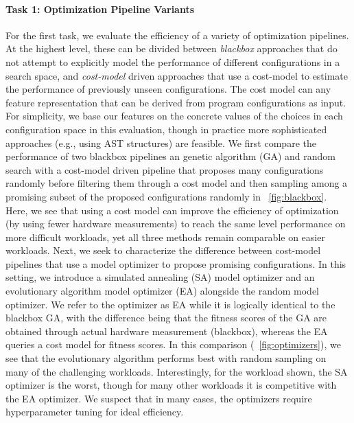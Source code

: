 \paragraph{Task 1: Optimization Pipeline Variants}
For the first task, we evaluate the efficiency of a variety of optimization pipelines.
At the highest level, these can be divided between \emph{blackbox} approaches that do not attempt to explicitly model the performance of different configurations in a search space, and \emph{cost-model} driven approaches that use a cost-model to estimate the performance of previously unseen configurations.
The cost model can any feature representation that can be derived from program configurations as input.
For simplicity, we base our features on the concrete values of the choices in each configuration space in this evaluation, though in practice more sophisticated approaches (e.g., using AST structures) are feasible.
We first compare the performance of two blackbox pipelines an genetic algorithm (GA) and random search with a cost-model driven pipeline that proposes many configurations randomly before filtering them through a cost model and then sampling among a promising subset of the proposed configurations randomly in ~\autoref{fig:blackbox}.
Here, we see that using a cost model can improve the efficiency of optimization (by using fewer hardware measurements) to reach the same level performance on more difficult workloads, yet all three methods remain comparable on easier workloads.
Next, we seek to characterize the difference between cost-model pipelines that use a model optimizer to propose promising configurations.
In this setting, we introduce a simulated annealing (SA) model optimizer and an evolutionary algorithm model optimizer (EA) alongside the random model optimizer.
We refer to the optimizer as EA while it is logically identical to the blackbox GA, with the difference being that the fitness scores of the GA are obtained through actual hardware measurement (blackbox), whereas the EA queries a cost model for fitness scores.
In this comparison (~\autoref{fig:optimizers}), we see that the evolutionary algorithm performs best with random sampling on many of the challenging workloads.
Interestingly, for the workload shown, the SA optimizer is the worst, though for many other workloads it is competitive with the EA optimizer.
We suspect that in many cases, the optimizers require hyperparameter tuning for ideal efficiency.

